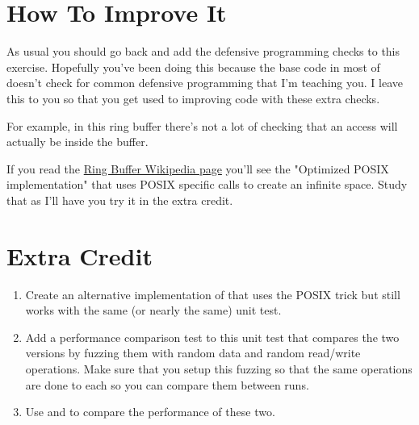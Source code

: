 \section{How To Improve It}

As usual you should go back and add the defensive programming checks
to this exercise.  Hopefully you've been doing this because the base
code in most of  doesn't check for common defensive
programming that I'm teaching you.  I leave this to you so that you get
used to improving code with these extra checks.

For example, in this ring buffer there's not a lot of checking that an
access will actually be inside the buffer.

If you read the \href{http://en.wikipedia.org/wiki/Ring_buffer}{Ring Buffer
Wikipedia page} you'll see the "Optimized POSIX implementation" that uses POSIX
specific calls to create an infinite space.  Study that as I'll have you 
try it in the extra credit.


\section{Extra Credit}

\begin{enumerate}
\item Create an alternative implementation of  that uses
    the POSIX trick but still works with the same (or nearly the same) unit test.
\item Add a performance comparison test to this unit test that compares the
    two versions by fuzzing them with random data and random read/write operations.
    Make sure that you setup this fuzzing so that the same operations are done
    to each so you can compare them between runs.
\item Use  and  to compare the 
    performance of these two.
\end{enumerate}

